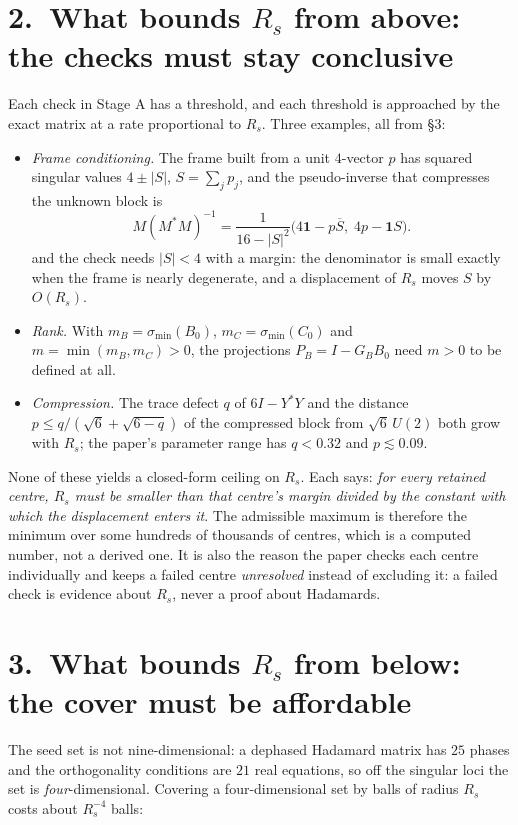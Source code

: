 \documentclass[11pt]{article}
\newcommand{\abs}[1]{\lvert #1\rvert}
\begin{document}
\section*{2.\ What bounds $R_s$ from above: the checks must stay conclusive}

Each check in Stage A has a threshold, and each threshold is approached by the exact matrix at a rate
proportional to $R_s$. Three examples, all from \S3:
\begin{itemize}
\item \emph{Frame conditioning.} The frame built from a unit $4$-vector $p$ has squared singular
values $4\pm\abs{S}$, $S=\sum_jp_j$, and the pseudo-inverse that compresses the unknown block is
\[
M(M^*M)^{-1}=\frac{1}{16-\abs{S}^2}\bigl(4\mathbf 1-p\overline S,\;4p-\mathbf 1S\bigr).
\]
and the check needs $\abs{S}<4$ with a margin: the denominator is small exactly when the frame is
nearly degenerate, and a displacement of $R_s$ moves $S$ by $O(R_s)$.
\item \emph{Rank.} With $m_B=\sigma_{\min}(B_0)$, $m_C=\sigma_{\min}(C_0)$ and $m=\min(m_B,m_C)>0$,
the projections $P_B=I-G_BB_0$ need $m>0$ to be defined at all.
\item \emph{Compression.} The trace defect $q$ of $6I-Y^*Y$ and the distance $p\le q/(\sqrt6+\sqrt{6-q})$
of the compressed block from $\sqrt6\,U(2)$ both grow with $R_s$; the paper's parameter range has
$q<0.32$ and $p\lesssim0.09$.
\end{itemize}
None of these yields a closed-form ceiling on $R_s$. Each says: \emph{for every retained centre, $R_s$
must be smaller than that centre's margin divided by the constant with which the displacement enters
it}. The admissible maximum is therefore the minimum over some hundreds of thousands of centres, which
is a computed number, not a derived one. It is also the reason the paper checks each centre
individually and keeps a failed centre \emph{unresolved} instead of excluding it: a failed check is
evidence about $R_s$, never a proof about Hadamards.

\section*{3.\ What bounds $R_s$ from below: the cover must be affordable}

The seed set is not nine-dimensional: a dephased Hadamard matrix has $25$ phases and the orthogonality
conditions are $21$ real equations, so off the singular loci the set is \emph{four}-dimensional.
Covering a four-dimensional set by balls of radius $R_s$ costs about $R_s^{-4}$ balls:
\end{document}
